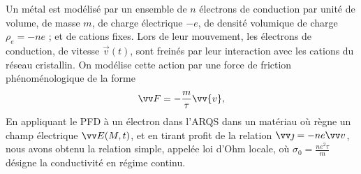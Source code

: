 \documentclass[12pt,fancy]{cours}
\begin{document}
Un métal est modélisé par un ensemble de $n$ électrons de conduction par unité de volume, de masse $m$, de charge électrique $-e$, de densité volumique de charge $\rho_e = - n e$ ; et de cations fixes. Lors de leur mouvement, les électrons de conduction, de vitesse $\Vec{v}(t)$, sont freinés par leur interaction avec les cations du réseau cristallin. On modélise cette action par une force de friction phénoménologique de la forme
\begin{equation}
\Vec{F} = -\frac{m}{\tau}\vv{v},
\end{equation}
En appliquant le PFD à un électron dans l'ARQS dans un matériau où règne un champ électrique $\E(M,t)$, et en tirant profit de la relation $\j = - ne \Vec{v}$, nous avons obtenu la relation simple, appelée loi d'Ohm locale,
où $\sigma_0=\frac{ne^2\tau}{m}$ désigne la conductivité en régime continu.
%
\end{document}
